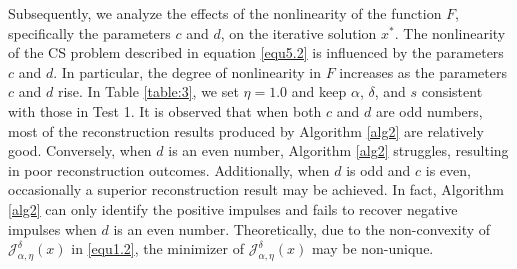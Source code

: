 \documentclass[a4paper,12pt]{article}
\numberwithin{equation}{section}
\begin{document}
\par Subsequently, we analyze the effects of the nonlinearity of the function $F$, specifically the parameters $c$ and $d$, on the iterative solution $x^{*}$. The nonlinearity of the CS problem described in equation \eqref{equ5.2} is influenced by the parameters $c$ and $d$. In particular, the degree of nonlinearity in $F$ increases as the parameters $c$ and $d$ rise. In Table \ref{table:3}, we set $\eta=1.0$ and keep $\alpha$, $\delta$, and $s$ consistent with those in Test 1. It is observed that when both $c$ and $d$ are odd numbers, most of the reconstruction results produced by Algorithm \ref{alg2} are relatively good. Conversely, when $d$ is an even number, Algorithm \ref{alg2} struggles, resulting in poor reconstruction outcomes. Additionally, when $d$ is odd and $c$ is even, occasionally a superior reconstruction result may be achieved. In fact, Algorithm \ref{alg2} can only identify the positive impulses and fails to recover negative impulses when $d$ is an even number. Theoretically, due to the non-convexity of $\mathcal{J}_{\alpha,\eta}^{\delta}\left(x\right)$ in \eqref{equ1.2}, the minimizer of $\mathcal{J}_{\alpha,\eta}^{\delta}\left(x\right)$ may be non-unique.

\begin{table}[H]
\caption{{\rm SNR} of reconstruction $x^{*}$ with different parameter $c$ and $d$, iterations number=1000.}
\label{table:3}
\centering
\tabcolsep=0.35cm
\linewidth
{}
\end{table}
\end{document}
